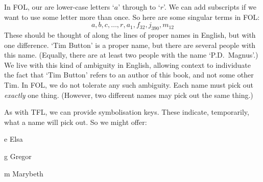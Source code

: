In FOL, our  are lower-case letters `$a$' through to `$r$'. We can add subscripts if we want to use some letter more than once. So here are some singular terms in FOL:
	$$a,b,c,\ldots, r, a_1, f_{32}, j_{390}, m_{12}$$
These should be thought of along the lines of proper names in English, but with one difference. `Tim Button' is a proper name, but there are several people with this name. (Equally, there are  at least two people with the name `P.D.\ Magnus'.) We live with this kind of ambiguity in English, allowing context to individuate the fact that `Tim Button' refers to an author of this book, and not some other Tim. In FOL, we do not tolerate any such ambiguity. Each name must pick out \emph{exactly} one thing. (However, two different names may pick out the same thing.)


As with TFL, we can provide symbolisation keys. These indicate, temporarily, what a name will pick out. So we might offer:
	\begin{ekey}
		\item[e] Elsa
		\item[g] Gregor
		\item[m] Marybeth
	\end{ekey}


